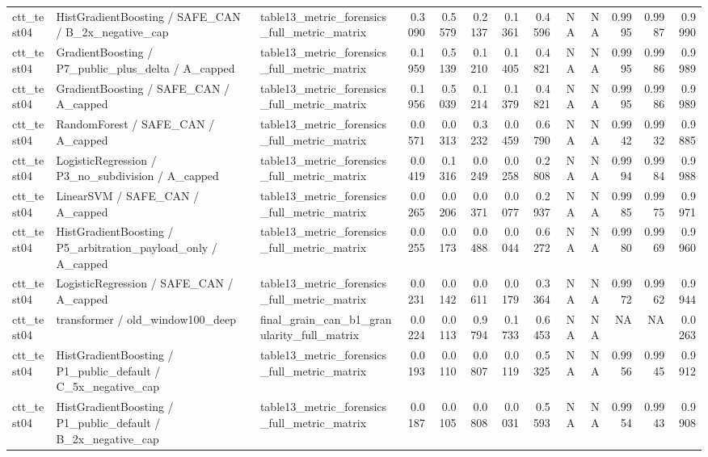 \begin{tabular}{lllrrrrrrrrrr}
ctt\_test04 & HistGradientBoosting / SAFE\_CAN / B\_2x\_negative\_cap & table13\_metric\_forensics\_full\_metric\_matrix & 0.3090 & 0.5579 & 0.2137 & 0.1361 & 0.4596 & NA & NA & 0.9995 & 0.9987 & 0.9990 \\
ctt\_test04 & GradientBoosting / P7\_public\_plus\_delta / A\_capped & table13\_metric\_forensics\_full\_metric\_matrix & 0.1959 & 0.5139 & 0.1210 & 0.1405 & 0.4821 & NA & NA & 0.9995 & 0.9986 & 0.9989 \\
ctt\_test04 & GradientBoosting / SAFE\_CAN / A\_capped & table13\_metric\_forensics\_full\_metric\_matrix & 0.1956 & 0.5039 & 0.1214 & 0.1379 & 0.4821 & NA & NA & 0.9995 & 0.9986 & 0.9989 \\
ctt\_test04 & RandomForest / SAFE\_CAN / A\_capped & table13\_metric\_forensics\_full\_metric\_matrix & 0.0571 & 0.0313 & 0.3232 & 0.0459 & 0.6790 & NA & NA & 0.9942 & 0.9932 & 0.9885 \\
ctt\_test04 & LogisticRegression / P3\_no\_subdivision / A\_capped & table13\_metric\_forensics\_full\_metric\_matrix & 0.0419 & 0.1316 & 0.0249 & 0.0258 & 0.2808 & NA & NA & 0.9994 & 0.9984 & 0.9988 \\
ctt\_test04 & LinearSVM / SAFE\_CAN / A\_capped & table13\_metric\_forensics\_full\_metric\_matrix & 0.0265 & 0.0206 & 0.0371 & 0.0077 & 0.2937 & NA & NA & 0.9985 & 0.9975 & 0.9971 \\
ctt\_test04 & HistGradientBoosting / P5\_arbitration\_payload\_only / A\_capped & table13\_metric\_forensics\_full\_metric\_matrix & 0.0255 & 0.0173 & 0.0488 & 0.0044 & 0.6272 & NA & NA & 0.9980 & 0.9969 & 0.9960 \\
ctt\_test04 & LogisticRegression / SAFE\_CAN / A\_capped & table13\_metric\_forensics\_full\_metric\_matrix & 0.0231 & 0.0142 & 0.0611 & 0.0179 & 0.3364 & NA & NA & 0.9972 & 0.9962 & 0.9944 \\
ctt\_test04 & transformer / old\_window100\_deep & final\_grain\_can\_b1\_granularity\_full\_matrix & 0.0224 & 0.0113 & 0.9794 & 0.1733 & 0.6453 & NA & NA & NA & NA & 0.0263 \\
ctt\_test04 & HistGradientBoosting / P1\_public\_default / C\_5x\_negative\_cap & table13\_metric\_forensics\_full\_metric\_matrix & 0.0193 & 0.0110 & 0.0807 & 0.0119 & 0.5325 & NA & NA & 0.9956 & 0.9945 & 0.9912 \\
ctt\_test04 & HistGradientBoosting / P1\_public\_default / B\_2x\_negative\_cap & table13\_metric\_forensics\_full\_metric\_matrix & 0.0187 & 0.0105 & 0.0808 & 0.0031 & 0.5593 & NA & NA & 0.9954 & 0.9943 & 0.9908 \\

\end{tabular}
